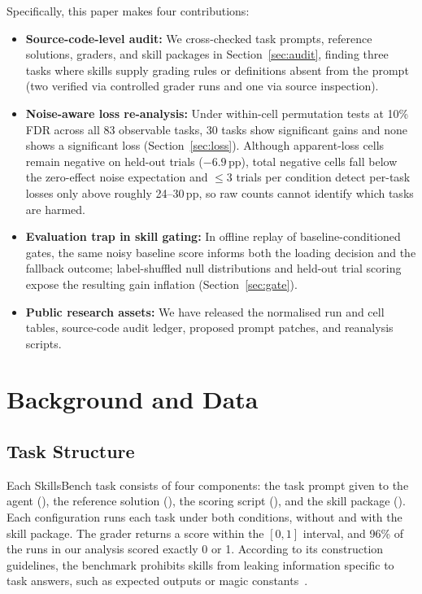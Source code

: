 \documentclass[10pt,conference]{IEEEtran}
\newif\ifkeepcuts \keepcutsfalse
\newcommand{\cut}[1]{\ifkeepcuts #1\fi}
\begin{document}
Specifically, this paper makes four contributions:
\begin{itemize}
\item \textbf{Source-code-level audit:} We cross-checked task prompts, reference solutions, graders, and skill packages in Section~\ref{sec:audit}, finding three tasks where skills supply grading rules or definitions absent from the prompt (two verified via controlled grader runs and one via source inspection).\cut{ Four tasks also retain placeholder directories, and one execution harness injects 48 built-in skills in most runs.}
\item \textbf{Noise-aware loss re-analysis:} Under within-cell permutation tests at 10\% FDR across all 83 observable tasks, 30 tasks show significant gains and none shows a significant loss (Section~\ref{sec:loss}). Although apparent-loss cells remain negative on held-out trials ($-6.9$\,pp), total negative cells fall below the zero-effect noise expectation and $\le 3$ trials per condition detect per-task losses only above roughly 24--30\,pp, so raw counts cannot identify which tasks are harmed.
\item \textbf{Evaluation trap in skill gating:} In offline replay of baseline-conditioned gates, the same noisy baseline score informs both the loading decision and the fallback outcome; label-shuffled null distributions and held-out trial scoring expose the resulting gain inflation (Section~\ref{sec:gate}).
\item \textbf{Public research assets:} We have released the normalised run and cell tables, source-code audit ledger, proposed prompt patches, and reanalysis scripts.
\end{itemize}

\section{Background and Data}
\label{sec:data}
\subsection{Task Structure}
\leavevmode{} Each SkillsBench task consists of four components: the task prompt given to the agent (), the reference solution (), the scoring script (), and the skill package (). Each configuration runs each task under both conditions, without and with the skill package. The grader returns a score within the $[0,1]$ interval, and 96\% of the runs in our analysis scored exactly 0 or 1. According to its construction guidelines, the benchmark prohibits skills from leaking information specific to task answers, such as expected outputs or magic constants~\cite{li2026skillsbench}.
\end{document}
